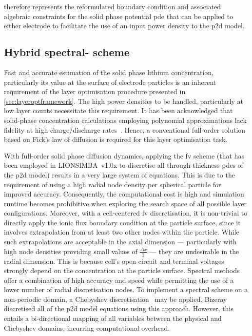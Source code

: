  therefore represents the
reformulated  boundary condition  and associated  algebraic constraints  for the
solid  phase potential  \gls{pde} that  can be  applied to  either electrode  to
facilitate the use of an input power density to the \gls{p2d} model.

\subsection{Hybrid spectral- scheme}\label{sec:hybridfv-spectral}

Fast  and  accurate  estimation  of   the  solid  phase  lithium  concentration,
particularly  its   value  at   the  surface  of   electrode  particles   is  an
inherent  requirement   of  the   layer  optimisation  procedure   presented  in
\cref{sec:layeroptframework}.   The  high   power  densities   to  be   handled,
particularly  at  low   layer  counts  necessitate  this   requirement.  It  has
been   acknowledged  that   solid-phase  concentration   calculations  employing
polynomial    approximations   lack    fidelity    at   high    charge/discharge
rates~\cite{Santhanagopalan2006}.  Hence,  a  conventional  full-order  solution
based on Fick's law of diffusion is required for this layer optimisation task.

With full-order  solid phase  diffusion dynamics,  applying the  \gls{fv} scheme
(that has been  employed in LIONSIMBA~v1.0x to  discretise all through-thickness
\gls{pde}s of the \gls{p2d} model) results  in a very large system of equations.
This is due to the requirement of using a high radial node density per spherical
particle for improved accuracy. Consequently, the computational cost is high and
simulation  runtime  becomes prohibitive  when  exploring  the search  space  of
all  possible  layer configurations.  Moreover,  with  a cell-centered  \gls{fv}
discretisation,  it is  non-trivial to  directly apply  the ionic  flux boundary
condition at the particle surface, since it involves extrapolation from at least
two other nodes within the particle. While such extrapolations are acceptable in
the axial  dimension --- particularly  with high node densities  providing small
values of $\frac{\Delta x}{2}$ --- they are undesirable in the radial dimension.
This  is because  cell's  open  circuit and  terminal  voltages strongly  depend
on  the  concentration  at  the  particle  surface.  Spectral  methods  offer  a
combination  of high  accuracy and  speed while  permitting the  use of  a lower
number  of radial  discretisation nodes.  To implement  a spectral  scheme on  a
non-periodic  domain,  a  Chebyshev discretisation~\cite{Trefethen2000}  may  be
applied.  Bizeray~\etal{}~\cite{Bizeray2015} discretised  all  of the  \gls{p2d}
model  equations using  this approach.  However, this  entails a  bi-directional
mapping of all  variables between the physical and  Chebyshev domains, incurring
computational overhead.

